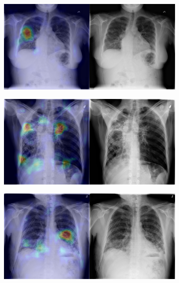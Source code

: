 \begin{figure}[b]
\begin{subfigure}{0.4\textwidth}
    \end{subfigure}
    \begin{subfigure}{0.4\textwidth}
        \centering
        \includegraphics[width=1.0\textwidth]{Chapters/5. Conclusiones/img/Pneumonia/1_1_1f0a35e1-1cd4-4d07-bacc-f22368f3cd08.png}
    \end{subfigure}
    \begin{subfigure}{0.4\textwidth}
        \centering
        \includegraphics[width=1.0\textwidth]{Chapters/5. Conclusiones/img/Pneumonia/1_1_1db7e52d-7a40-49ff-9f24-bc72a33f9c23.png}
    \end{subfigure}
    \begin{subfigure}{0.4\textwidth}
        \centering
        \includegraphics[width=1.0\textwidth]{Chapters/5. Conclusiones/img/Pneumonia/1_1_0ebc8268-df3d-45d8-8ee7-b34880c62830.png}

\end{subfigure}
\end{figure}
